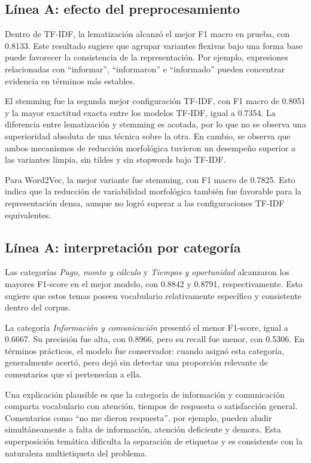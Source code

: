 \documentclass[12pt,a4paper]{article}
\begin{document}
\subsection{Línea A: efecto del preprocesamiento}

Dentro de TF-IDF, la lematización alcanzó el mejor F1 macro en prueba, con 0.8133. Este resultado sugiere que agrupar variantes flexivas bajo una forma base puede favorecer la consistencia de la representación. Por ejemplo, expresiones relacionadas con ``informar'', ``informaron'' e ``informado'' pueden concentrar evidencia en términos más estables.

El stemming fue la segunda mejor configuración TF-IDF, con F1 macro de 0.8051 y la mayor exactitud exacta entre los modelos TF-IDF, igual a 0.7354. La diferencia entre lematización y stemming es acotada, por lo que no se observa una superioridad absoluta de una técnica sobre la otra. En cambio, se observa que ambos mecanismos de reducción morfológica tuvieron un desempeño superior a las variantes limpia, sin tildes y sin stopwords bajo TF-IDF.

Para Word2Vec, la mejor variante fue stemming, con F1 macro de 0.7825. Esto indica que la reducción de variabilidad morfológica también fue favorable para la representación densa, aunque no logró superar a las configuraciones TF-IDF equivalentes.

\subsection{Línea A: interpretación por categoría}

Las categorías \textit{Pago, monto y cálculo} y \textit{Tiempos y oportunidad} alcanzaron los mayores F1-score en el mejor modelo, con 0.8842 y 0.8791, respectivamente. Esto sugiere que estos temas poseen vocabulario relativamente específico y consistente dentro del corpus.

La categoría \textit{Información y comunicación} presentó el menor F1-score, igual a 0.6667. Su precisión fue alta, con 0.8966, pero su recall fue menor, con 0.5306. En términos prácticos, el modelo fue conservador: cuando asignó esta categoría, generalmente acertó, pero dejó sin detectar una proporción relevante de comentarios que sí pertenecían a ella.

Una explicación plausible es que la categoría de información y comunicación comparta vocabulario con atención, tiempos de respuesta o satisfacción general. Comentarios como ``no me dieron respuesta'', por ejemplo, pueden aludir simultáneamente a falta de información, atención deficiente y demora. Esta superposición temática dificulta la separación de etiquetas y es consistente con la naturaleza multietiqueta del problema.
\end{document}
